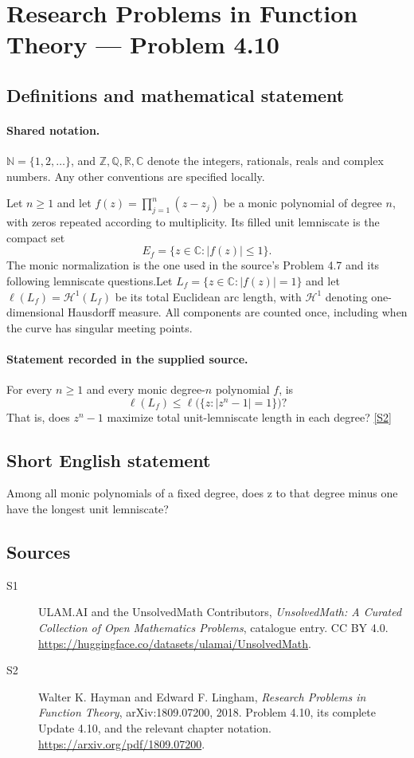 \documentclass[11pt]{book}
\newcommand{\sref}[2]{\hyperlink{source:#1:#2}{[S#2]}}
\begin{document}
\section{Research Problems in Function Theory — Problem 4.10}\label{statement}

\subsection{Definitions and mathematical statement}

\paragraph{Shared notation.}$\mathbb N=\{1,2,\ldots\}$, and $\mathbb Z,\mathbb Q,\mathbb R,\mathbb C$ denote the integers, rationals, reals and complex numbers. Any other conventions are specified locally.


Let $n\ge1$ and let $f(z)=\prod_{j=1}^n(z-z_j)$ be a monic polynomial of degree $n$, with zeros repeated according to multiplicity. Its filled unit lemniscate is the compact set
\[E_f=\{z\in\mathbb C:|f(z)|\le1\}.
\]
The monic normalization is the one used in the source's Problem 4.7 and its following lemniscate questions.Let $L_f=\{z\in\mathbb C:|f(z)|=1\}$ and let $\ell(L_f)=\mathcal H^1(L_f)$ be its total Euclidean arc length, with $\mathcal H^1$ denoting one-dimensional Hausdorff measure. All components are counted once, including when the curve has singular meeting points.
\paragraph{Statement recorded in the supplied source.}
For every $n\ge1$ and every monic degree-$n$ polynomial $f$, is
\[\ell(L_f)\le\ell\bigl(\{z:|z^n-1|=1\}\bigr)?\]
That is, does $z^n-1$ maximize total unit-lemniscate length in each degree? \sref{statement}{2}
\subsection{Short English statement}
Among all monic polynomials of a fixed degree, does z to that degree minus one have the longest unit lemniscate?
\subsection{Sources}
\begin{description}
\item[\hypertarget{source:statement:1}{S1}] ULAM.AI and the UnsolvedMath Contributors, \emph{UnsolvedMath: A Curated Collection of Open Mathematics Problems}, catalogue entry. CC BY 4.0. \url{https://huggingface.co/datasets/ulamai/UnsolvedMath}.
\item[\hypertarget{source:statement:2}{S2}] Walter K. Hayman and Edward F. Lingham, \emph{Research Problems in Function Theory}, arXiv:1809.07200, 2018. Problem 4.10, its complete Update 4.10, and the relevant chapter notation. \url{https://arxiv.org/pdf/1809.07200}.
\end{description}
\label{end:statement}
\end{document}
